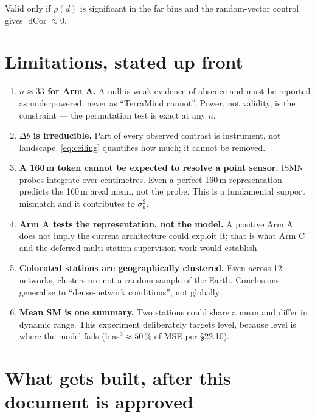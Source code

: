 \documentclass[11pt,a4paper]{article}
\newcommand{\dcor}{\operatorname{dCor}}
\begin{document}
Valid only if $\rho(d)$ is significant in the far bins and the random-vector control gives
$\dcor \approx 0$.

\section{Limitations, stated up front}

\begin{enumerate}[nosep]
  \item \textbf{$n \approx 33$ for Arm A.} A null is weak evidence of absence and must be
        reported as underpowered, never as ``TerraMind cannot''. Power, not validity, is
        the constraint --- the permutation test is exact at any $n$.
  \item \textbf{$\Delta b$ is irreducible.} Part of every observed contrast is instrument,
        not landscape. \eqref{eq:ceiling} quantifies how much; it cannot be removed.
  \item \textbf{A 160\,m token cannot be expected to resolve a point sensor.} ISMN probes
        integrate over centimetres. Even a perfect 160\,m representation predicts the
        160\,m areal mean, not the probe. This is a fundamental support mismatch and it
        contributes to $\sigma_b^2$.
  \item \textbf{Arm A tests the representation, not the model.} A positive Arm A does not
        imply the current architecture could exploit it; that is what Arm C and the
        deferred multi-station-supervision work would establish.
  \item \textbf{Colocated stations are geographically clustered.} Even across 12 networks,
        clusters are not a random sample of the Earth. Conclusions generalise to
        ``dense-network conditions'', not globally.
  \item \textbf{Mean SM is one summary.} Two stations could share a mean and differ in
        dynamic range. This experiment deliberately targets level, because level is where
        the model fails (bias$^2 \approx 50\,\%$ of MSE per \S22.10).
\end{enumerate}

\section{What gets built, after this document is approved}
\end{document}
